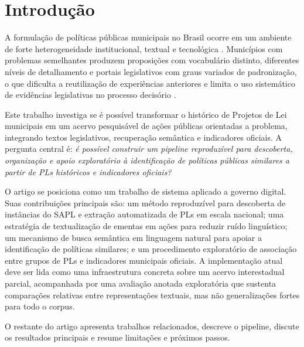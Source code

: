 \section{Introdução}

A formulação de políticas públicas municipais no Brasil ocorre em um ambiente de forte heterogeneidade institucional, textual e tecnológica \cite{herman_marques_miola_2022,oliveira_compolitica_2024}. Municípios com problemas semelhantes produzem proposições com vocabulário distinto, diferentes níveis de detalhamento e portais legislativos com graus variados de padronização, o que dificulta a reutilização de experiências anteriores e limita o uso sistemático de evidências legislativas no processo decisório \cite{shipan_volden_2008}.

Este trabalho investiga se é possível transformar o histórico de Projetos de Lei municipais em um acervo pesquisável de ações públicas orientadas a problema, integrando textos legislativos, recuperação semântica e indicadores oficiais. A pergunta central é: \textit{é possível construir um pipeline reproduzível para descoberta, organização e apoio exploratório à identificação de políticas públicas similares a partir de PLs históricos e indicadores oficiais?}

O artigo se posiciona como um trabalho de sistema aplicado a governo digital. Suas contribuições principais são: um método reproduzível para descoberta de instâncias do SAPL e extração automatizada de PLs em escala nacional; uma estratégia de textualização de ementas em ações para reduzir ruído linguístico; um mecanismo de busca semântica em linguagem natural para apoiar a identificação de políticas similares; e um procedimento exploratório de associação entre grupos de PLs e indicadores municipais oficiais. A implementação atual deve ser lida como uma infraestrutura concreta sobre um acervo interestadual parcial, acompanhada por uma avaliação anotada exploratória que sustenta comparações relativas entre representações textuais, mas não generalizações fortes para todo o corpus.

O restante do artigo apresenta trabalhos relacionados, descreve o pipeline, discute os resultados principais e resume limitações e próximos passos.
